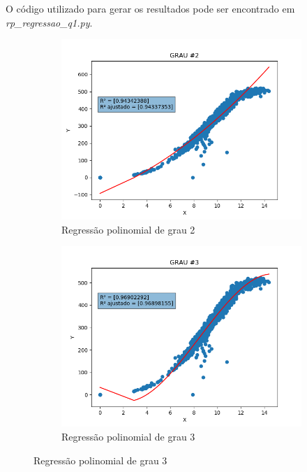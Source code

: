 \documentclass[paper=a4, fontsize=11pt]{scrartcl}
\numberwithin{equation}{section}		%
\numberwithin{figure}{section}			%
\numberwithin{table}{section}				%
\begin{document}
	O código utilizado para gerar os resultados pode ser encontrado em \textit{rp\_regressao\_q1.py}.
	
	\newpage
	
	\begin{figure}[h!]
		\begin{subfigure}{.5\textwidth}
			\centering
			\includegraphics[width=\linewidth]{img/q1_fig_GRAU2.png}
			\caption{Regressão polinomial de grau 2}
			\label{fig:q1grau2}
		\end{subfigure}%
		\begin{subfigure}{.5\textwidth}
			\centering
			\includegraphics[width=\linewidth]{img/q1_fig_GRAU3.png}
			\caption{Regressão polinomial de grau 3}
			\label{fig:q1_grau3}

\end{subfigure}
\end{figure}
\end{document}
